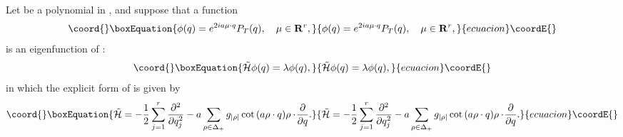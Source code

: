 \documentclass[a4paper,12pt]{article}
\begin{document}
Let \coordHE{} be a polynomial in \coordHE{},
\coordHE{} and   suppose that a function  \coordHE{}
\begin{equation}\coord{}\boxEquation{
   \phi(q)=e^{2ia\mu\cdot q}P_T(q),\quad \mu\in{\bf R}^r,
   \label{trigeigen}
}{
   \phi(q)=e^{2ia\mu\cdot q}P_T(q),\quad \mu\in{\bf R}^r,
   }{ecuacion}\coordE{}\end{equation}
is an eigenfunction
of \coordHE{}:
\begin{equation}\coord{}\boxEquation{
   \tilde{\cal H}\phi(q)=\lambda \phi(q),
   }{
   \tilde{\cal H}\phi(q)=\lambda \phi(q),
   }{ecuacion}\coordE{}\end{equation}
   in which the explicit form of \coordHE{} is given by
   \begin{equation}\coord{}\boxEquation{
   \tilde{\cal H}=
   -{1\over2}\sum_{j=1}^r{\partial^2\over{\partial q_j^2}}
   -a\sum_{\rho\in\Delta_+}{g_{|\rho|}\cot{(a\rho\cdot q)}}
   \rho\cdot\!{\partial\over{\partial q}}.
   \label{Htilcot}
}{
   \tilde{\cal H}=
   -{1\over2}\sum_{j=1}^r{\partial^2\over{\partial q_j^2}}
   -a\sum_{\rho\in\Delta_+}{g_{|\rho|}\cot{(a\rho\cdot q)}}
   \rho\cdot\!{\partial\over{\partial q}}.
   }{ecuacion}\coordE{}\end{equation}
\end{document}
